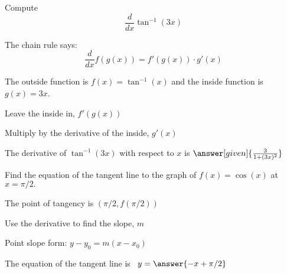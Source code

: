 \documentclass{ximera}
\begin{document}
\begin{problem} %
  Compute
  \[
  \frac{d}{dx} \tan^{-1}(3x)
  \]
  
    \begin{hint}
      The chain rule says:
      \[
      \frac{d}{dx} f(g(x)) = f'(g(x))\cdot g'(x)
      \]
    \end{hint}
    \begin{hint}
      The outside function is $f(x) = \tan^{-1}(x)$ and the inside
      function is $g(x) = 3x$.
    \end{hint}
    \begin{hint}
		  Leave the inside in, $f'(g(x))$
		\end{hint}
		\begin{hint}
		  Multiply by the derivative of the inside, $g'(x)$
		\end{hint}
    
		The derivative of $\tan^{-1}(3x)$ with respect to $x$ is
		 $\answer[given]{\frac{3}{1+(3x)^2}}$
		
\end{problem}



\begin{problem} %
Find the equation of the tangent line to the graph of $f(x) = \cos(x)$ at $x=\pi/2.$


\begin{hint}
The point of tangency is $(\pi/2, f(\pi/2))$
\end{hint}
\begin{hint}
Use the derivative to find the slope, $m$
\end{hint}
\begin{hint}
Point slope form: $y-y_0 = m(x-x_0)$
\end{hint}

The equation of the tangent line is \ $y = \answer{-x + \pi/2}$

\end{problem}
\end{document}
